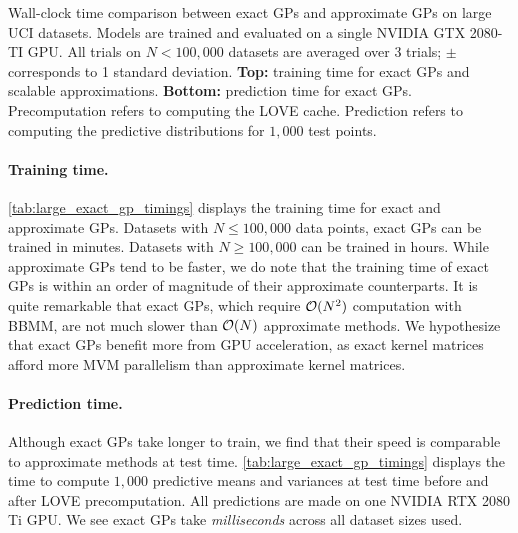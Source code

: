\begin{table}[t!]
  \vspace{1em}
  \caption[Wall-clock time comparison between exact GPs and approximate GPs on large UCI datasets.]{
    Wall-clock time comparison between exact GPs and approximate GPs on large UCI datasets.
    Models are trained and evaluated on a single NVIDIA GTX 2080-TI GPU.
    All trials on $N < 100,\!000$ datasets are averaged over 3 trials; $\pm$ corresponds to 1 standard deviation.
    {\bf Top:} training time for exact GPs and scalable approximations.
    {\bf Bottom:} prediction time for exact GPs.
    Precomputation refers to computing the LOVE cache.
    Prediction refers to computing the predictive distributions for $1,\!000$ test points.
  }
  \label{tab:large_exact_gp_timings}
  \centering
  \vspace{1em}

  \resizebox{\textwidth}{!}{%
    
  }
  \vspace{1em}

  \resizebox{\textwidth}{!}{%
    
  }

  \vspace{2em}
\end{table}


\paragraph{Training time.}
\cref{tab:large_exact_gp_timings} displays the training time for exact and approximate GPs.
Datasets with $N \leq 100,\!000$ data points, exact GPs can be trained in minutes.
Datasets with $N \geq 100,\!000$ can be trained in hours.
While approximate GPs tend to be faster, we do note that the training time of exact GPs is within an order of magnitude of their approximate counterparts.
It is quite remarkable that exact GPs, which require $\bigo{N^2}$ computation with BBMM, are not much slower than $\bigo{N}$ approximate methods.
We hypothesize that exact GPs benefit more from GPU acceleration, as exact kernel matrices afford more MVM parallelism than approximate kernel matrices.

\paragraph{Prediction time.}
Although exact GPs take longer to train, we find that their speed is comparable to approximate methods at test time.
\cref{tab:large_exact_gp_timings} displays the time to compute $1,\!000$ predictive means and variances at test time before and after LOVE precomputation.
All predictions are made on one NVIDIA RTX 2080 Ti GPU.
We see exact GPs take \emph{milliseconds} across all dataset sizes used.

